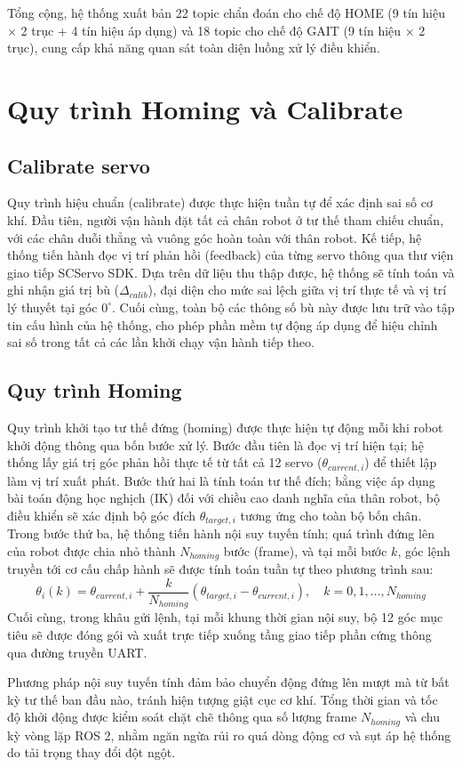 Tổng cộng, hệ thống xuất bản 22 topic chẩn đoán cho chế độ HOME (9 tín hiệu $\times$ 2 trục + 4 tín hiệu áp dụng) và 18 topic cho chế độ GAIT (9 tín hiệu $\times$ 2 trục), cung cấp khả năng quan sát toàn diện luồng xử lý điều khiển.

\section{Quy trình Homing và Calibrate}

\subsection{Calibrate servo}

Quy trình hiệu chuẩn (calibrate) được thực hiện tuần tự để xác định sai số cơ khí. Đầu tiên, người vận hành đặt tất cả chân robot ở tư thế tham chiếu chuẩn, với các chân duỗi thẳng và vuông góc hoàn toàn với thân robot. Kế tiếp, hệ thống tiến hành đọc vị trí phản hồi (feedback) của từng servo thông qua thư viện giao tiếp SCServo SDK. Dựa trên dữ liệu thu thập được, hệ thống sẽ tính toán và ghi nhận giá trị bù ($\Delta_{calib}$), đại diện cho mức sai lệch giữa vị trí thực tế và vị trí lý thuyết tại góc $0^\circ$. Cuối cùng, toàn bộ các thông số bù này được lưu trữ vào tập tin cấu hình của hệ thống, cho phép phần mềm tự động áp dụng để hiệu chỉnh sai số trong tất cả các lần khởi chạy vận hành tiếp theo.

\subsection{Quy trình Homing}

Quy trình khởi tạo tư thế đứng (homing) được thực hiện tự động mỗi khi robot khởi động thông qua bốn bước xử lý. Bước đầu tiên là đọc vị trí hiện tại; hệ thống lấy giá trị góc phản hồi thực tế từ tất cả 12 servo ($\theta_{current,i}$) để thiết lập làm vị trí xuất phát. Bước thứ hai là tính toán tư thế đích; bằng việc áp dụng bài toán động học nghịch (IK) đối với chiều cao danh nghĩa của thân robot, bộ điều khiển sẽ xác định bộ góc đích $\theta_{target,i}$ tương ứng cho toàn bộ bốn chân. Trong bước thứ ba, hệ thống tiến hành nội suy tuyến tính; quá trình đứng lên của robot được chia nhỏ thành $N_{homing}$ bước (frame), và tại mỗi bước $k$, góc lệnh truyền tới cơ cấu chấp hành sẽ được tính toán tuần tự theo phương trình sau:
\begin{equation}
    \theta_i(k) = \theta_{current,i} + \frac{k}{N_{homing}} (\theta_{target,i} - \theta_{current,i}), \quad k = 0, 1, \ldots, N_{homing}
\end{equation}
Cuối cùng, trong khâu gửi lệnh, tại mỗi khung thời gian nội suy, bộ 12 góc mục tiêu sẽ được đóng gói và xuất trực tiếp xuống tầng giao tiếp phần cứng thông qua đường truyền UART.

Phương pháp nội suy tuyến tính đảm bảo chuyển động đứng lên mượt mà từ bất kỳ tư thế ban đầu nào, tránh hiện tượng giật cục cơ khí. Tổng thời gian và tốc độ khởi động được kiểm soát chặt chẽ thông qua số lượng frame $N_{homing}$ và chu kỳ vòng lặp ROS 2, nhằm ngăn ngừa rủi ro quá dòng động cơ và sụt áp hệ thống do tải trọng thay đổi đột ngột.

